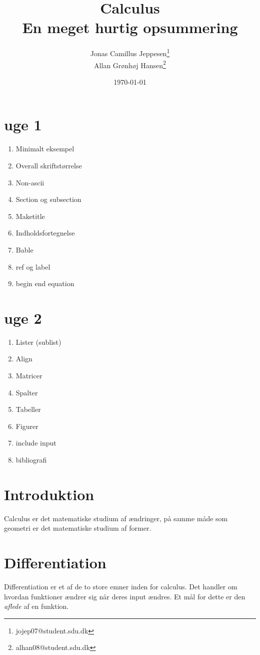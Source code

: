 \documentclass[a4paper, 11pt]{article}
\title{{\Huge Calculus}\\ En meget hurtig opsummering}
\date{\today}
\author{Jonas Camillus Jeppesen\thanks{jojep07@student.sdu.dk} \\
		Allan Grønhøj Hansen\thanks{alhan08@student.sdu.dk}}
\begin{document}
\maketitle
\newpage

\section{uge 1}
\begin{enumerate}
	\item Minimalt eksempel
	\item Overall skriftstørrelse
	\item Non-ascii
	\item Section og subsection
	\item Maketitle
	\item Indholdsfortegnelse
	\item Bable
	\item ref og label 
	\item begin end equation
\end{enumerate}

\section{uge 2}
\begin{enumerate}
	\item Lister (sublist)
	\item Align
	\item Matricer
	\item Spalter
	\item Tabeller
	\item Figurer
	\item include input
	\item bibliografi
\end{enumerate}
\newpage

\section{Introduktion}
Calculus er det matematiske studium af ændringer, på samme måde som geometri er det matematiske studium af former. 

\section{Differentiation}
Differentiation er et af de to store emner inden for calculus. Det handler om hvordan funktioner ændrer sig når deres input ændres. Et mål for dette er den \emph{aflede} af en funktion. 
\end{document}
